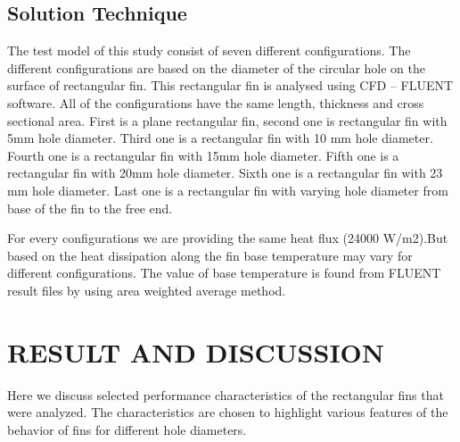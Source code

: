\section{Solution Technique}

The test model of this study consist of seven different configurations. The different configurations are based on the diameter of the circular hole on the surface of rectangular fin. This rectangular fin is analysed using CFD – FLUENT software.  All of the configurations have the same length, thickness and cross sectional area. First is a plane rectangular fin, second one is rectangular fin with 5mm hole diameter. Third one is a rectangular fin with 10 mm hole diameter. Fourth one is a rectangular fin with 15mm hole diameter. Fifth one is a rectangular fin with 20mm hole diameter. Sixth one is a rectangular fin with 23 mm hole diameter. Last one is a rectangular fin with varying hole diameter from base of the fin to the free end.

For every configurations we are providing the same heat flux (24000 W/m2).But based on the heat dissipation along the fin base temperature may vary for different configurations. The value of base temperature is found from FLUENT result files by using area weighted average method. 



\chapter{RESULT AND DISCUSSION}

Here we discuss selected performance characteristics of the rectangular fins that were analyzed. The characteristics are chosen to highlight various features of the behavior of fins for different hole diameters.


